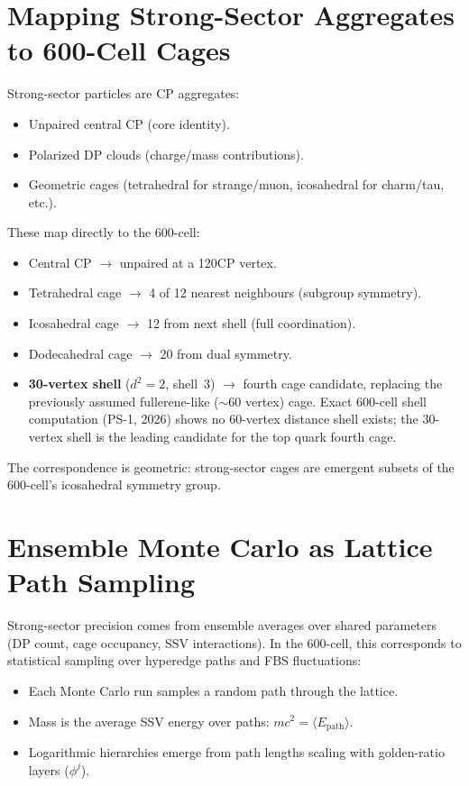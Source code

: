 \documentclass[11pt]{article}
\begin{document}
\section{Mapping Strong-Sector Aggregates to 600-Cell Cages}

Strong-sector particles are CP aggregates:
\begin{itemize}
\item Unpaired central CP (core identity).
\item Polarized DP clouds (charge/mass contributions).
\item Geometric cages (tetrahedral for strange/muon, icosahedral for
  charm/tau, etc.).
\end{itemize}

These map directly to the 600-cell:
\begin{itemize}
\item Central CP $\to$ unpaired at a 120CP vertex.
\item Tetrahedral cage $\to$ 4 of 12 nearest neighbours (subgroup symmetry).
\item Icosahedral cage $\to$ 12 from next shell (full coordination).
\item Dodecahedral cage $\to$ 20 from dual symmetry.
\item \textbf{30-vertex shell} ($d^2 = 2$, shell~3) $\to$ fourth cage
  candidate, replacing the previously assumed fullerene-like (${\sim}60$
  vertex) cage. Exact 600-cell shell computation (PS-1, 2026) shows no
  60-vertex distance shell exists; the 30-vertex shell is the leading
  candidate for the top quark fourth cage.
\end{itemize}

The correspondence is geometric: strong-sector cages are emergent subsets
of the 600-cell's icosahedral symmetry group.

\section{Ensemble Monte Carlo as Lattice Path Sampling}

Strong-sector precision comes from ensemble averages over shared parameters
(DP count, cage occupancy, SSV interactions). In the 600-cell, this
corresponds to statistical sampling over hyperedge paths and FBS fluctuations:
\begin{itemize}
\item Each Monte Carlo run samples a random path through the lattice.
\item Mass is the average SSV energy over paths: $m c^2 = \langle E_{\text{path}} \rangle$.
\item Logarithmic hierarchies emerge from path lengths scaling with
  golden-ratio layers ($\phi^j$).
\end{itemize}
\end{document}
